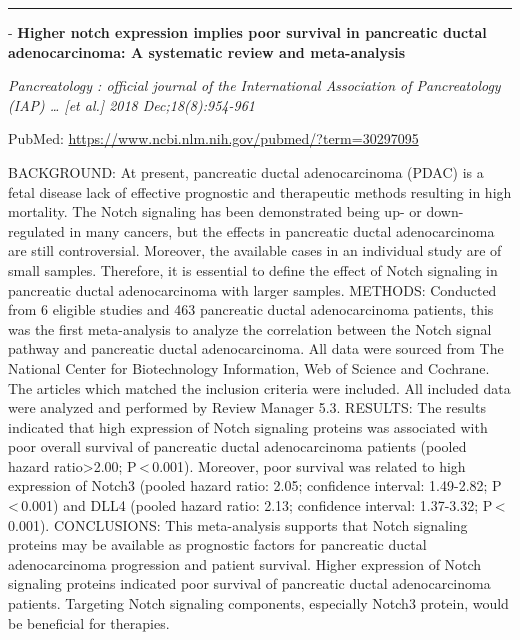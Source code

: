 \documentclass[]{article}
\begin{document}
{}

{}

\begin{center}\rule{0.5\linewidth}{\linethickness}\end{center}

 - \textbf{Higher notch expression implies poor survival in pancreatic
ductal adenocarcinoma: A systematic review and meta-analysis}

\emph{Pancreatology : official journal of the International Association
of Pancreatology (IAP) \ldots{} {[}et al.{]} 2018 Dec;18(8):954-961}

PubMed: \url{https://www.ncbi.nlm.nih.gov/pubmed/?term=30297095}

BACKGROUND: At present, pancreatic ductal adenocarcinoma (PDAC) is a
fetal disease lack of effective prognostic and therapeutic methods
resulting in high mortality. The Notch signaling has been demonstrated
being up- or down-regulated in many cancers, but the effects in
pancreatic ductal adenocarcinoma are still controversial. Moreover, the
available cases in an individual study are of small samples. Therefore,
it is essential to define the effect of Notch signaling in pancreatic
ductal adenocarcinoma with larger samples. METHODS: Conducted from 6
eligible studies and 463 pancreatic ductal adenocarcinoma patients, this
was the first meta-analysis to analyze the correlation between the Notch
signal pathway and pancreatic ductal adenocarcinoma. All data were
sourced from The National Center for Biotechnology Information, Web of
Science and Cochrane. The articles which matched the inclusion criteria
were included. All included data were analyzed and performed by Review
Manager 5.3. RESULTS: The results indicated that high expression of
Notch signaling proteins was associated with poor overall survival of
pancreatic ductal adenocarcinoma patients (pooled hazard
ratio\textgreater{}2.00; P\,\textless{}\,0.001). Moreover, poor survival
was related to high expression of Notch3 (pooled hazard ratio: 2.05;
confidence interval: 1.49-2.82; P\,\textless{}\,0.001) and DLL4 (pooled
hazard ratio: 2.13; confidence interval: 1.37-3.32;
P\,\textless{}\,0.001). CONCLUSIONS: This meta-analysis supports that
Notch signaling proteins may be available as prognostic factors for
pancreatic ductal adenocarcinoma progression and patient survival.
Higher expression of Notch signaling proteins indicated poor survival of
pancreatic ductal adenocarcinoma patients. Targeting Notch signaling
components, especially Notch3 protein, would be beneficial for
therapies.
\end{document}
